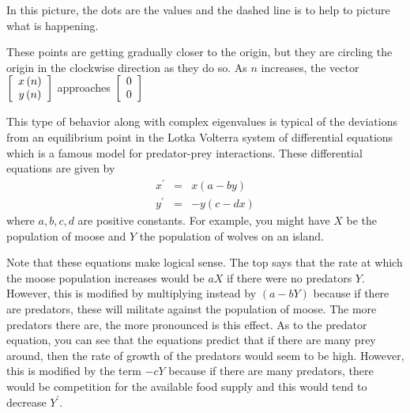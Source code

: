 \begin{solution}
In this picture, the dots are the values and the dashed line is to help to
picture what is happening.

These points are getting gradually closer to the origin, but they are
circling the origin in the clockwise direction as they do so. As $n$ increases,
the vector  $\left[
\begin{array}{c}
x\left( n\right) \\
y\left( n\right)
\end{array}
\right]$ approaches $ \left[
\begin{array}{r}
0 \\
0
\end{array}
\right]$
\end{solution}

This type of behavior along with complex eigenvalues is typical of the
deviations from an equilibrium point in the Lotka Volterra system of
differential equations which is a famous model for predator-prey
interactions. These differential equations are given by
\begin{eqnarray*}
x^{\prime } &=&x\left( a-by\right) \\
y^{\prime } &=&-y\left( c-dx\right)
\end{eqnarray*}
where $a,b,c,d$ are positive constants. For example, you might have $X$ be
the population of moose and $Y$ the population of wolves on an island.

Note that these equations make logical sense. The top says that the rate at which
the moose population increases would be $aX$ if there were no predators $Y$.
However, this is modified by multiplying instead by $\left( a-bY\right) $
because if there are predators, these will militate against the population
of moose.  The more predators there
are, the more pronounced is this effect. As to the predator equation, you
can see that the equations predict that if there are many prey around, then
the rate of growth of the predators would seem to be high. However, this is
modified by the term $-cY$ because if there are many predators, there would
be competition for the available food supply and this would tend to decrease
$Y^{\prime }.$

